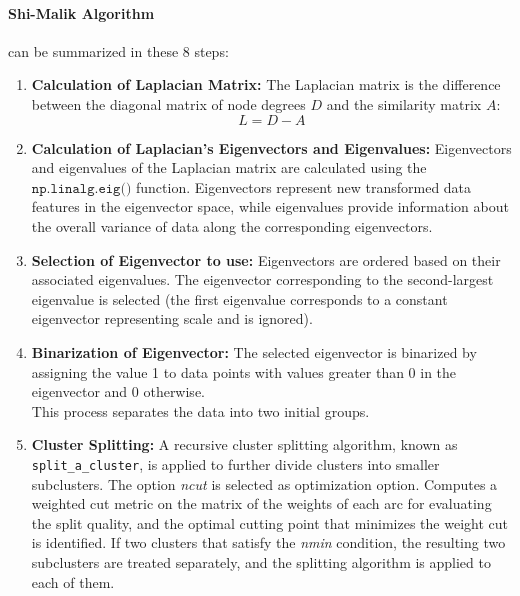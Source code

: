 \paragraph{Shi-Malik Algorithm} can be summarized in these 8 steps:

\begin{enumerate}
    
  \item \textbf{Calculation of Laplacian Matrix:}
  The Laplacian matrix is the difference between the diagonal matrix of node degrees \(D\) and the similarity matrix \(A\):
  \begin{equation}
    L = D - A
  \end{equation}
  
  \item \textbf{Calculation of Laplacian's Eigenvectors and Eigenvalues:}
  Eigenvectors and eigenvalues of the Laplacian matrix are calculated using the $\texttt{np.linalg.eig()}$ function. Eigenvectors represent new transformed data features in the eigenvector space, while eigenvalues provide information about the overall variance of data along the corresponding eigenvectors.
  
  \item \textbf{Selection of Eigenvector to use:}
  Eigenvectors are ordered based on their associated eigenvalues.
  The eigenvector corresponding to the second-largest eigenvalue is selected (the first eigenvalue corresponds to a constant eigenvector representing scale and is ignored).
  
  \item \textbf{Binarization of Eigenvector:}
  The selected eigenvector is binarized by assigning the value 1 to data points with values greater than 0 in the eigenvector and 0 otherwise. \\
  This process separates the data into two initial groups.
  
  \item \textbf{Cluster Splitting:}
  A recursive cluster splitting algorithm, known as \texttt{split\_a\_cluster}, is applied to further divide clusters into smaller subclusters.
  The option \textit{ncut} is selected as optimization option.
  Computes a weighted cut metric on the matrix of the weights of each arc for evaluating the split quality, and the optimal cutting point that minimizes the weight cut is identified.
  If two clusters that satisfy the \textit{nmin} condition, the resulting two subclusters are treated separately, and the splitting algorithm is applied to each of them.
  

\end{enumerate}
